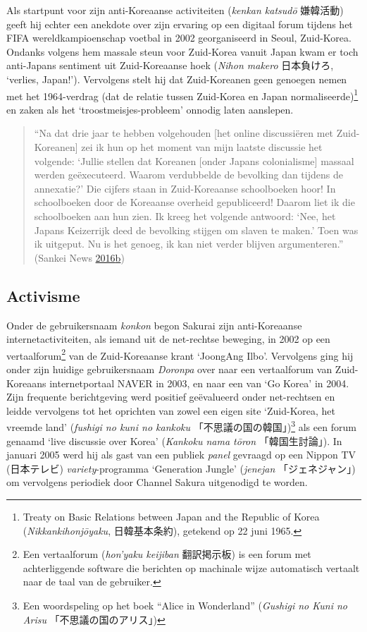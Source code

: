 \documentclass[10.5pt,dutch,]{article}
\begin{document}
Als startpunt voor zijn anti-Koreaanse activiteiten (\emph{kenkan
katsudō} 嫌韓活動) geeft hij echter een anekdote over zijn ervaring op
een digitaal forum tijdens het FIFA wereldkampioenschap voetbal in 2002
georganiseerd in Seoul, Zuid-Korea. Ondanks volgens hem massale steun
voor Zuid-Korea vanuit Japan kwam er toch anti-Japans sentiment uit
Zuid-Koreaanse hoek (\emph{Nihon makero} 日本負けろ, `verlies, Japan!').
Vervolgens stelt hij dat Zuid-Koreanen geen genoegen nemen met het
1964-verdrag (dat de relatie tussen Zuid-Korea en Japan
normaliseerde)\footnote{Treaty on Basic Relations between Japan and the
  Republic of Korea (\emph{Nikkankihonjōyaku}, 日韓基本条約), getekend
  op 22 juni 1965.} en zaken als het `troostmeisjes-probleem' onnodig
laten aanslepen.

\begin{quote}
``Na dat drie jaar te hebben volgehouden {[}het online discussiëren met
Zuid-Koreanen{]} zei ik hun op het moment van mijn laatste discussie het
volgende: `Jullie stellen dat Koreanen {[}onder Japans colonialisme{]}
massaal werden geëxecuteerd. Waarom verdubbelde de bevolking dan tijdens
de annexatie?' Die cijfers staan in Zuid-Koreaanse schoolboeken hoor! In
schoolboeken door de Koreaanse overheid gepubliceerd! Daarom liet ik die
schoolboeken aan hun zien. Ik kreeg het volgende antwoord: `Nee, het
Japans Keizerrijk deed de bevolking stijgen om slaven te maken.' Toen
was ik uitgeput. Nu is het genoeg, ik kan niet verder blijven
argumenteren.'' (Sankei News
\protect\hyperlink{ref-sankeiux5fnewsux5ftokyochiji-senux5f2016-1}{2016}\protect\hyperlink{ref-sankeiux5fnewsux5ftokyochiji-senux5f2016-1}{b})
\end{quote}

\subsection{Activisme}\label{activisme}

Onder de gebruikersnaam \emph{konkon} begon Sakurai zijn anti-Koreaanse
internetactiviteiten, als iemand uit de net-rechtse beweging, in 2002 op
een vertaalforum\footnote{Een vertaalforum (\emph{hon'yaku keijiban}
  翻訳掲示板) is een forum met achterliggende software die berichten op
  machinale wijze automatisch vertaalt naar de taal van de gebruiker.}
van de Zuid-Koreaanse krant `JoongAng Ilbo'. Vervolgens ging hij onder
zijn huidige gebruikersnaam \emph{Doronpa} over naar een vertaalforum
van Zuid-Koreaans internetportaal NAVER in 2003, en naar een van `Go
Korea' in 2004. Zijn frequente berichtgeving werd positief geëvalueerd
onder net-rechtsen en leidde vervolgens tot het oprichten van zowel een
eigen site `Zuid-Korea, het vreemde land' (\emph{fushigi no kuni no
kankoku} 「不思議の国の韓国」)\footnote{Een woordspeling op het boek
  ``Alice in Wonderland'' (\emph{Gushigi no Kuni no Arisu}
  「不思議の国のアリス」)} als een forum genaamd `live discussie over
Korea' (\emph{Kankoku nama tōron} 「韓国生討論」). In januari 2005 werd
hij als gast van een publiek \emph{panel} gevraagd op een Nippon TV
(日本テレビ) \emph{variety}-programma `Generation Jungle'
(\emph{jenejan} 「ジェネジャン」) om vervolgens periodiek door Channel
Sakura uitgenodigd te worden.
\end{document}
